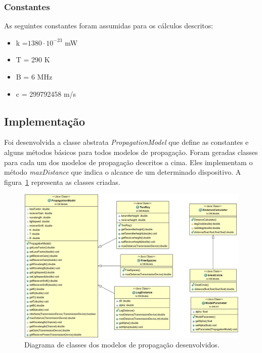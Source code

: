 \subsubsection{Constantes}

As seguintes constantes foram assumidas para os cálculos descritos:

\begin{itemize}
\item k =\begin{math}1380\cdot 10^{-23}\end{math}  mW
\item T = 290 K
\item B = 6 MHz
\item c = 299792458 m/s
\end{itemize}


\subsection{Implementação}

Foi desenvolvida a classe abstrata \textit{PropagationModel} que define as constantes e alguns métodos básicos para todos modelos de propagação. Foram geradas classes para cada um dos modelos de propagação descritos a cima. Eles implementam o método \textit{maxDistance} que indica o alcance de um determinado dispositivo. A figura~\ref{fig:models} representa as classes criadas.

\begin{figure}[htb]
\centering
\includegraphics[width=1.0\textwidth]{figs/models}
\caption[\textit{Diagrama de classes dos modelos de propagação desenvolvidos}.]
{Diagrama de classes dos modelos de propagação desenvolvidos.}
\label{fig:models}
\end{figure} 

